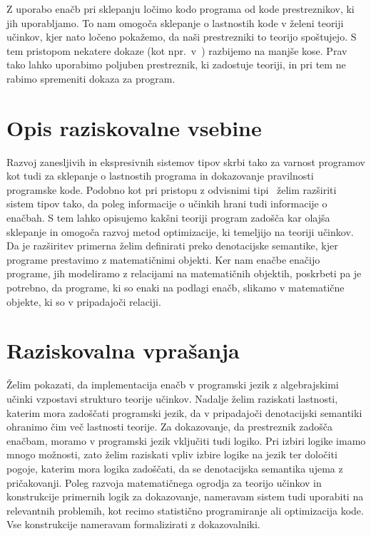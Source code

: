 \documentclass{article}
\begin{document}
Z uporabo enačb pri sklepanju ločimo kodo programa od kode prestreznikov, ki jih uporabljamo. To nam omogoča sklepanje o lastnostih kode v želeni teoriji učinkov, kjer nato ločeno pokažemo, da naši prestrezniki to teorijo spoštujejo. S tem pristopom nekatere dokaze (kot npr.\ v~\cite{DBLP:journals/jlp/BauerP15}) razbijemo na manjše kose. Prav tako lahko uporabimo poljuben prestreznik, ki zadostuje teoriji, in pri tem ne rabimo spremeniti dokaza za program.

\section*{Opis raziskovalne vsebine}

Razvoj zanesljivih in ekspresivnih sistemov tipov skrbi tako za varnost programov kot tudi za sklepanje o lastnostih programa in dokazovanje pravilnosti programske kode. Podobno kot pri pristopu z odvisnimi tipi~\cite{DBLP:journals/pacmpl/Ahman18} želim razširiti sistem tipov tako, da poleg informacije o učinkih hrani tudi informacije o enačbah. S tem lahko opisujemo kakšni teoriji program zadošča kar olajša sklepanje in omogoča razvoj metod optimizacije, ki temeljijo na teoriji učinkov. Da je razširitev primerna želim definirati preko denotacijske semantike, kjer programe prestavimo z matematičnimi objekti. Ker nam enačbe enačijo programe, jih modeliramo z relacijami na matematičnih objektih, poskrbeti pa je potrebno, da programe, ki so enaki na podlagi enačb, slikamo v matematične objekte, ki so v pripadajoči relaciji. 

\section*{Raziskovalna vprašanja}

Želim pokazati, da implementacija enačb v programski jezik z algebrajskimi učinki vzpostavi strukturo teorije učinkov. Nadalje želim raziskati lastnosti, katerim mora zadoščati programski jezik, da v pripadajoči denotacijski semantiki ohranimo čim več lastnosti teorije. Za dokazovanje, da prestreznik zadošča enačbam, moramo v programski jezik vključiti tudi logiko. Pri izbiri logike imamo mnogo možnosti, zato želim raziskati vpliv izbire logike na jezik ter določiti pogoje, katerim mora logika zadoščati, da se denotacijska semantika ujema z pričakovanji. Poleg razvoja matematičnega ogrodja za teorijo učinkov in konstrukcije primernih logik za dokazovanje, nameravam sistem tudi uporabiti na relevantnih problemih, kot recimo statistično programiranje ali optimizacija kode. Vse konstrukcije nameravam formalizirati z dokazovalniki. 
\end{document}
